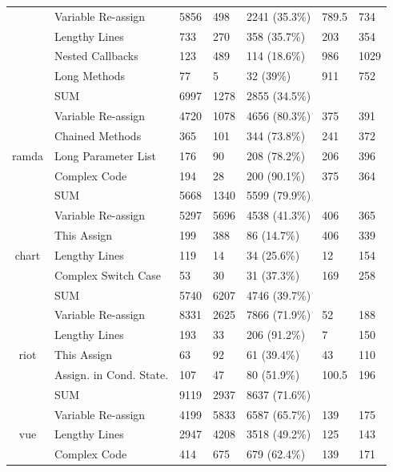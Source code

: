 {\begin{table}[!htbp]
{\begin{tabular}{c|l|l|l|m{2cm}|m{2cm}|m{2cm}}
		& Variable Re-assign & 5856 & 498 & 2241 (35.3\%) & 789.5 & 734 \\ \cline{2-7}
		& Lengthy Lines & 733 & 270 & 358 (35.7\%) & 203 & 354 \\ \cline{2-7}
		& Nested Callbacks & 123 & 489 & 114 (18.6\%) & 986 & 1029 \\ \cline{2-7}
		& Long Methods & 77 & 5 & 32 (39\%) & 911 & 752 \\ \cline{2-7}
		& SUM & 6997 & 1278 & 2855 (34.5\%) & & \\ \hline
		\multirow{5}{*}{ramda}
		& Variable Re-assign & 4720 & 1078 & 4656 (80.3\%) & 375 & 391 \\ \cline{2-7}
		& Chained Methods & 365 & 101 & 344 (73.8\%) & 241 & 372 \\ \cline{2-7}
		& Long Parameter List & 176 & 90 & 208 (78.2\%) & 206 & 396 \\ \cline{2-7}
		& Complex Code & 194 & 28 & 200 (90.1\%) & 375 & 364 \\ \cline{2-7}
		& SUM & 5668 & 1340 & 5599 (79.9\%) & & \\ \hline
		\multirow{5}{*}{chart}
		& Variable Re-assign & 5297 & 5696 & 4538 (41.3\%) & 406 & 365 \\ \cline{2-7}
		& This Assign & 199 & 388 & 86 (14.7\%) & 406 & 339 \\ \cline{2-7}
		& Lengthy Lines & 119 & 14 & 34 (25.6\%) & 12 & 154 \\ \cline{2-7}
		& Complex Switch Case & 53 & 30 & 31 (37.3\%) & 169 & 258 \\ \cline{2-7}
		& SUM & 5740 & 6207 & 4746 (39.7\%) & & \\ \hline
		\multirow{5}{*}{riot}
		& Variable Re-assign & 8331 & 2625 & 7866 (71.9\%) & 52 & 188 \\ \cline{2-7}
		& Lengthy Lines & 193 & 33 & 206 (91.2\%) & 7 & 150 \\ \cline{2-7}
		& This Assign & 63 & 92 & 61 (39.4\%) & 43 & 110 \\ \cline{2-7}
		& Assign. in Cond. State. & 107 & 47 & 80 (51.9\%) & 100.5 & 196 \\ \cline{2-7}
		& SUM & 9119 & 2937 & 8637 (71.6\%) & & \\ \hline
		\multirow{5}{*}{vue}
		& Variable Re-assign & 4199 & 5833 & 6587 (65.7\%) & 139 & 175 \\ \cline{2-7}
		& Lengthy Lines & 2947 & 4208 & 3518 (49.2\%) & 125 & 143 \\ \cline{2-7}
		& Complex Code & 414 & 675 & 679 (62.4\%) & 139 & 171 \\ \cline{2-7}

\end{tabular}}
\end{table}}
